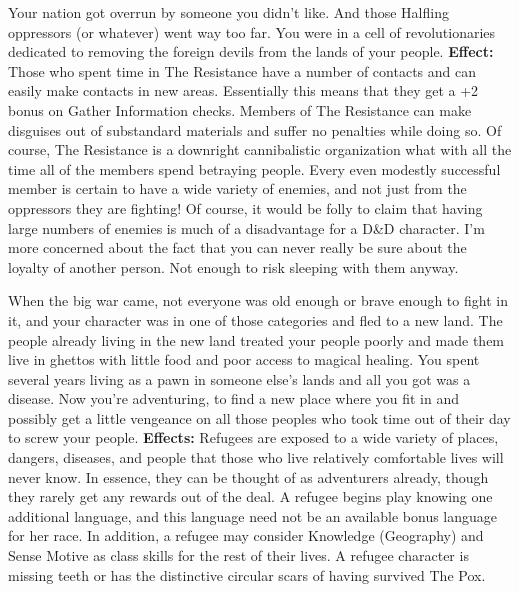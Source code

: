 \medskip{}
{Your nation got overrun by someone you didn't like. And those Halfling oppressors (or whatever) went way too far. You were in a cell of revolutionaries dedicated to removing the foreign devils from the lands of your people.}
\textbf{Effect:}{ Those who spent time in The Resistance have a number of contacts and can easily make contacts in new areas. Essentially this means that they get a +2 bonus on Gather Information checks. Members of The Resistance can make disguises out of substandard materials and suffer no penalties while doing so. Of course, The Resistance is a downright cannibalistic organization what with all the time all of the members spend betraying people. Every even modestly successful member is certain to have a wide variety of enemies, and not just from the oppressors they are fighting! Of course, it would be folly to claim that having large numbers of enemies is much of a disadvantage for a D\&D character. I'm more concerned about the fact that you can never really be sure about the loyalty of another person. Not enough to risk sleeping with them anyway.}

\clearpage
\medskip{}
{When the big war came, not everyone was old enough or brave enough to fight in it, and your character was in one of those categories and fled to a new land. The people already living in the new land treated your people poorly and made them live in ghettos with little food and poor access to magical healing. You spent several years living as a pawn in someone else's lands and all you got was a disease. Now you're adventuring, to find a new place where you fit in and possibly get a little vengeance on all those peoples who took time out of their day to screw your people.}
\textbf{Effects:}{ Refugees are exposed to a wide variety of places, dangers, diseases, and people that those who live relatively comfortable lives will never know. In essence, they can be thought of as adventurers already, though they rarely get any rewards out of the deal. A refugee begins play knowing one additional language, and this language need not be an available bonus language for her race. In addition, a refugee may consider Knowledge (Geography) and Sense Motive as class skills for the rest of their lives. A refugee character is missing teeth or has the distinctive circular scars of having survived The Pox.}

